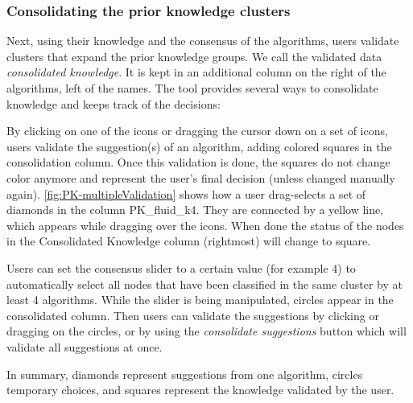 \subsubsection{Consolidating the prior knowledge clusters}
\label{sec:validating-pk}

Next, using their knowledge and the consensus of the algorithms, users validate clusters that expand the prior knowledge groups. We call the validated data \emph{consolidated knowledge}. It is kept in an additional column on the right of the algorithms, left of the names. The tool provides several ways to consolidate knowledge and keeps track of the decisions:


\begin{description}[leftmargin=0pt,nosep]

\item [Partial Copy.] By clicking on one of the icons or dragging the cursor down on a set of icons, users validate the suggestion(s) of an algorithm, adding colored squares in the consolidation column. Once this validation is done, the squares do not change color anymore and represent the user's final decision (unless changed manually again). \autoref{fig:PK-multipleValidation} shows how a user drag-selects a set of diamonds in the column PK\_fluid\_k4. They are connected by a yellow line, which appears while dragging over the icons.
When done the status of the nodes in the Consolidated Knowledge column (rightmost) will change to square.

\item [Consensus slider.] Users can set the consensus slider to a certain value (for example 4) to automatically select all nodes that have been classified in the same cluster by at least 4 algorithms. While the slider is being manipulated, circles appear in the consolidated column.  Then users can validate the suggestions by clicking or dragging on the circles, or by using the \emph{consolidate suggestions} button which will validate all suggestions at once.
\item In summary, diamonds represent suggestions from one algorithm, circles temporary choices, and squares represent the knowledge validated by the user.





\end{description}
